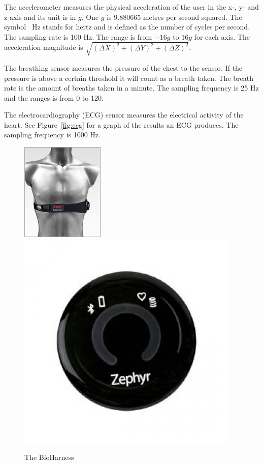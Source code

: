 			The accelerometer measures the physical acceleration of the user in the x-, y- and z-axis and its unit is in $g$. One $g$ is 9.880665 metres per second squared. The symbol \SI{}{\hertz} stands for hertz and is defined as the number of cycles per second. The sampling rate is 100 Hz. The range is from $-16g$ to $16g$ for each axis. The acceleration magnitude is $\sqrt{(\Delta X)^2+(\Delta Y)^2+(\Delta Z)^2}$.

			The breathing sensor measures the pressure of the chest to the sensor. If the pressure is above a certain threshold it will count as a breath taken. The breath rate is the amount of breaths taken in a minute. The sampling frequency is 25 Hz and the ranges is from 0 to 120.

			The electrocardiography (ECG) \cite{ECG} sensor measures the electrical activity of the heart. See Figure~\ref{fig:ecg} for a graph of the results an ECG produces. The sampling frequency is 1000 Hz.

			\begin{figure}[h]
				\centering
					\includegraphics[scale=2.0]{bh.jpg}
					\includegraphics[scale=0.25]{bhclose.jpg}
					
					\caption{The BioHarness}

			\end{figure}

